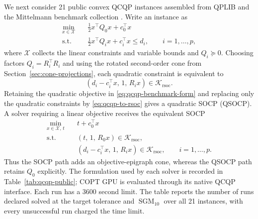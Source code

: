 \documentclass[letterpaper]{article} %
\theoremstyle{definition}
\theoremstyle{remark}
\begin{document}
We next consider 21 public convex QCQP instances assembled from QPLIB
\cite{furini2019qplib} and the Mittelmann benchmark collection
\cite{mittelmann2021decision}. Write an instance as
\begin{equation}
\label{eq:qcqp-benchmark-form}
\begin{aligned}
    \min_{x\in\mathcal X}\quad
        & \frac12 x^\top Q_0x+c_0^\top x \\
    \mathrm{s.t.}\quad
        & \frac12 x^\top Q_ix+c_i^\top x\le d_i,
        \qquad i=1,\ldots,p,
\end{aligned}
\end{equation}
where $\mathcal X$ collects the linear constraints and variable bounds and
$Q_i\succeq0$.  Choosing factors $Q_i=R_i^\top R_i$ and using the rotated
second-order cone from Section~\ref{sec:cone-projections}, each quadratic
constraint is equivalent to
\begin{equation}
\label{eq:qcqp-to-rsoc}
    (d_i-c_i^\top x,\,1,\,R_ix)\in\mathcal K_{\mathrm{rsoc}}.
\end{equation}
Retaining the quadratic objective in
\eqref{eq:qcqp-benchmark-form} and replacing only the quadratic constraints by
\eqref{eq:qcqp-to-rsoc} gives a quadratic SOCP (QSOCP). A solver requiring a
linear objective receives the equivalent SOCP
\begin{equation}
\label{eq:qcqp-to-socp}
\begin{aligned}
    \min_{x\in\mathcal X,\,t}\quad & t+c_0^\top x \\
    \mathrm{s.t.}\quad
        & (t,\,1,\,R_0x)\in\mathcal K_{\mathrm{rsoc}},\\
        & (d_i-c_i^\top x,\,1,\,R_ix)\in\mathcal K_{\mathrm{rsoc}},
          \qquad i=1,\ldots,p.
\end{aligned}
\end{equation}
Thus the SOCP path adds an objective-epigraph cone, whereas the QSOCP path
retains $Q_0$ explicitly. The formulation used by each solver is recorded in
Table~\ref{tab:qcqp-public}; COPT GPU is evaluated through its native QCQP
interface. Each run has a 3600 second limit. The table reports the number of
runs declared solved at the target tolerance and $\operatorname{SGM}_{10}$ over
all 21 instances, with every unsuccessful run charged the time limit.
\end{document}
